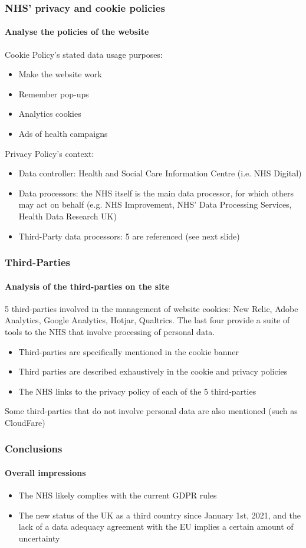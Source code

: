 \documentclass[aspectratio=43]{beamer}
\begin{document}
\begin{frame}
    \frametitle{NHS' privacy and cookie policies}
    \framesubtitle{Analyse the policies of the website}
    Cookie Policy's stated data usage purposes:
    \begin{itemize}
        \item Make the website work
        \item Remember pop-ups
        \item Analytics cookies
        \item Ads of health campaigns\newline
    \end{itemize}
    Privacy Policy's context:
    \begin{itemize}
        \item Data controller: Health and Social Care Information Centre (i.e. NHS Digital)
        \item Data processors: the NHS itself is the main data processor, for which others may act on behalf (e.g. NHS Improvement, NHS' Data Processing Services, Health Data Research UK)
        \item Third-Party data processors: 5 are referenced (see next slide)
    \end{itemize}
\end{frame}

\begin{frame}
    \frametitle{Third-Parties}
    \framesubtitle{Analysis of the third-parties on the site}
    5 third-parties involved in the management of website cookies: New Relic, Adobe Analytics, Google Analytics, Hotjar, Qualtrics. The last four provide a suite of tools to the NHS that involve processing of personal data.\newline
    \begin{itemize}
        \item Third-parties are specifically mentioned in the cookie banner
        \item Third parties are described exhaustively in the cookie and privacy policies
        \item The NHS links to the privacy policy of each of the 5 third-parties\newline
    \end{itemize}
    Some third-parties that do not involve personal data are also mentioned (such as CloudFare)
\end{frame}

\begin{frame}
    \frametitle{Conclusions}
    \framesubtitle{Overall impressions}
    \begin{itemize}
    \item The NHS likely complies with the current GDPR rules\newline
    \item The new status of the UK as a third country since January 1st, 2021, and the lack of a data adequacy agreement with the EU implies a certain amount of uncertainty
    \end{itemize}
\end{frame}
\end{document}

